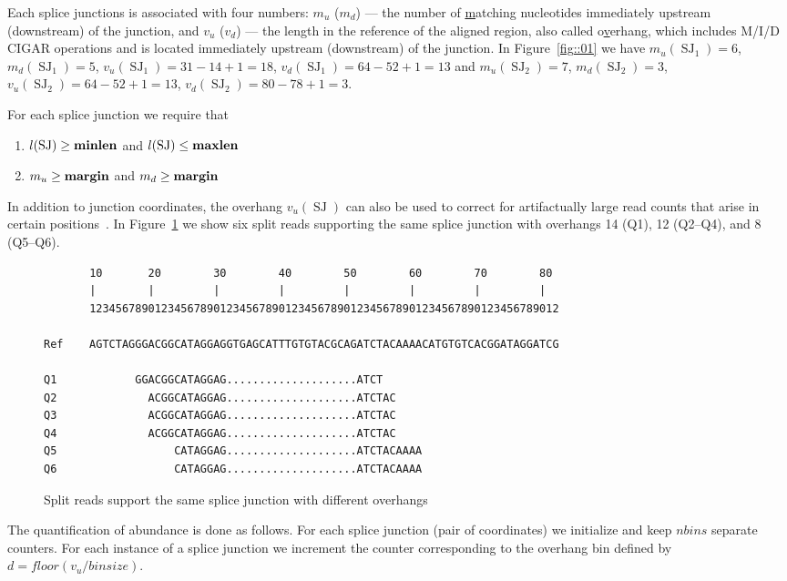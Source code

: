 \documentclass{article}
\DeclareMathOperator{\SJ}{SJ}
\begin{document}
Each splice junctions is associated with four numbers: $m_u$ ($m_d$) --- the number of \underline{m}atching 
nucleotides immediately upstream (downstream) of the junction, and $v_u$ ($v_d$) --- the length in the 
reference of the aligned region, also called o\underline{v}erhang, which includes M/I/D CIGAR operations 
and is located immediately upstream (downstream) of the junction. In Figure~\ref{fig::01} we have 
$m_u(\SJ_1)=6$, $m_d(\SJ_1)=5$, $v_u(\SJ_1)=31-14+1=18$, $v_d(\SJ_1)=64-52+1=13$ and
$m_u(\SJ_2)=7$, $m_d(\SJ_2)=3$, $v_u(\SJ_2)=64-52+1=13$, $v_d(\SJ_2)=80-78+1=3$.

For each splice junction we require that
\begin{enumerate}
\item $l(\SJ)\ge \rm\bf minlen$ and $l(\SJ)\le \rm\bf maxlen$
\item $m_u\ge \rm\bf margin$ and $m_d\ge \rm\bf margin$
\end{enumerate}

In addition to junction coordinates, the overhang $v_u(\SJ)$ can also be used to correct for artifactually large read 
counts that arise in certain positions~\cite{pmid22537040}. In Figure~\ref{fig::02} we show six split reads supporting 
the same splice junction with overhangs 14 (Q1), 12 (Q2--Q4), and 8 (Q5--Q6).
%
\begin{figure}[h]
\footnotesize
\begin{verbatim}
       10       20        30        40        50        60        70        80
       |        |         |         |         |         |         |         |
       123456789012345678901234567890123456789012345678901234567890123456789012

Ref    AGTCTAGGGACGGCATAGGAGGTGAGCATTTGTGTACGCAGATCTACAAAACATGTGTCACGGATAGGATCG

Q1            GGACGGCATAGGAG....................ATCT      
Q2              ACGGCATAGGAG....................ATCTAC    
Q3              ACGGCATAGGAG....................ATCTAC    
Q4              ACGGCATAGGAG....................ATCTAC    
Q5                  CATAGGAG....................ATCTACAAAA
Q6                  CATAGGAG....................ATCTACAAAA
\end{verbatim}
\caption{Split reads support the same splice junction with different overhangs\label{fig::02}}
\end{figure}

The quantification of abundance is done as follows. For each splice junction (pair of coordinates) 
we initialize and keep $nbins$ separate counters. For each instance of a splice junction we increment 
the counter corresponding to the overhang bin defined by $d=floor(v_u/binsize)$.
\end{document}
